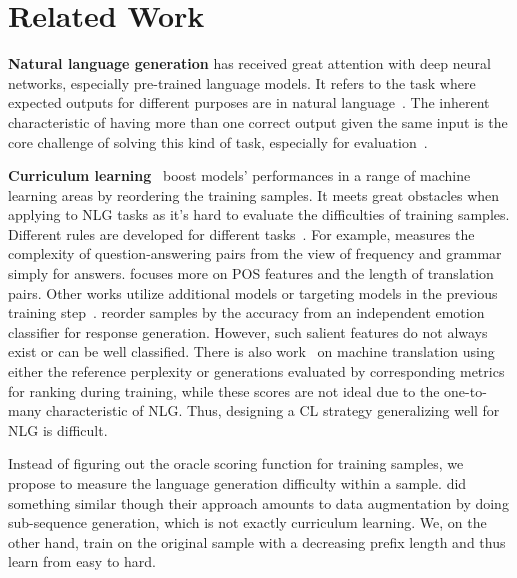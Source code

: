 \section{Related Work}
\textbf{Natural language generation} has received great attention with deep neural networks, especially pre-trained language models. It refers to the task where expected outputs for different purposes are in natural language~\cite{dong2021survey}. The inherent characteristic of having more than one correct output given the same input is the core challenge of solving this kind of task, especially for evaluation~\cite{singh2018does}.



\textbf{Curriculum learning}~\cite{bengio2009curriculum} boost models' performances in a range of machine learning areas by reordering the training samples.
It meets great obstacles when applying to NLG tasks as it's hard to evaluate the difficulties of training samples. 
Different rules are developed for different tasks~\cite{platanios2019competence,chang2021does}. For example, \cite{liu2018curriculum} measures the complexity of question-answering pairs from the view of frequency and grammar simply for answers. \cite{kocmi2017curriculum} focuses more on POS features and the length of translation pairs.
Other works utilize additional models or targeting models in the previous training step~\cite{zhang-etal-2019-curriculum,zhang2018empirical}. \citet{shen2020cdl} reorder samples by the accuracy from an independent emotion classifier for response generation. However, such salient features do not always exist or can be well classified. There is also work~\cite{zhou2020uncertainty} on machine translation using either the reference perplexity or generations evaluated by corresponding metrics for ranking during training, while these scores are not ideal due to the one-to-many characteristic of NLG. 
Thus, designing a CL strategy generalizing well for NLG is difficult.

Instead of figuring out the oracle scoring function for training samples, 
we propose to measure the language generation difficulty within a sample. 
\citet{liang-etal-2021-token-wise} did something similar though their approach
amounts to data augmentation by doing sub-sequence generation, which is
not exactly curriculum learning. We, on the other hand,  train on the original sample with a decreasing prefix length and thus learn from easy to hard.
